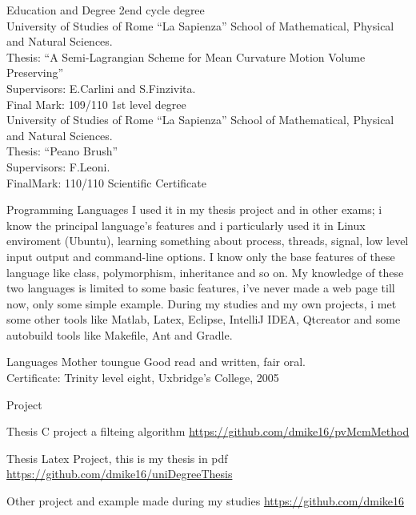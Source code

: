 \documentclass[a4paper,11pt,noweblinkbox=true,eventconfortaa]{dmCV}
\begin{document}
\address{Via Prenestina 226}
\personaldata
\begin{eventlist}{Education and Degree}
  {\scriptsize 2end cycle degree}\\
 University of Studies of Rome ``La Sapienza'' School of 
 Mathematical, Physical and Natural Sciences.\\
 Thesis: ``A Semi-Lagrangian Scheme for Mean Curvature Motion Volume
 Preserving''\\  
 Supervisors: E.Carlini and  S.Finzivita.\\
 Final Mark: 109/110
  {\scriptsize 1st level degree}\\
 University of Studies of Rome ``La Sapienza'' School of 
 Mathematical, Physical and Natural Sciences.\\
 Thesis: ``Peano Brush''\\
 Supervisors: F.Leoni.\\ 
 FinalMark: 110/110
       {\scriptsize Scientific Certificate}
\end{eventlist}

\begin{eventlist}{Programming Languages}
   I used it in my thesis project and
  in other exams; i know the principal language's features and i particularly
  used it in Linux enviroment (Ubuntu), learning something about process, 
  threads, signal, low level input output and command-line options. 
   I know only the base features of
  these language like class, polymorphism, inheritance and so on.
   My knowledge of these two
  languages is limited to some basic features, i've never made a web
  page till now, only some simple example.
   During my studies and my own projects, i
  met some other tools like Matlab, Latex, Eclipse, IntelliJ IDEA,
  Qtcreator and some autobuild tools like Makefile, Ant and Gradle.
\end{eventlist}

\begin{eventlist}{Languages}
   Mother toungue
   Good read and written, fair oral.\\
  Certificate: Trinity level eight, Uxbridge's College, 2005
\end{eventlist}

\begin{eventlist}{Project}
  \item Thesis C project a filteing algorithm {\scriptsize\url{https://github.com/dmike16/pvMcmMethod}}
  \item Thesis Latex Project, this is my thesis in pdf {\scriptsize\url{https://github.com/dmike16/uniDegreeThesis}}
  \item Other project and example made during my studies {\scriptsize\url{https://github.com/dmike16}}
\end{eventlist}
\end{document}
